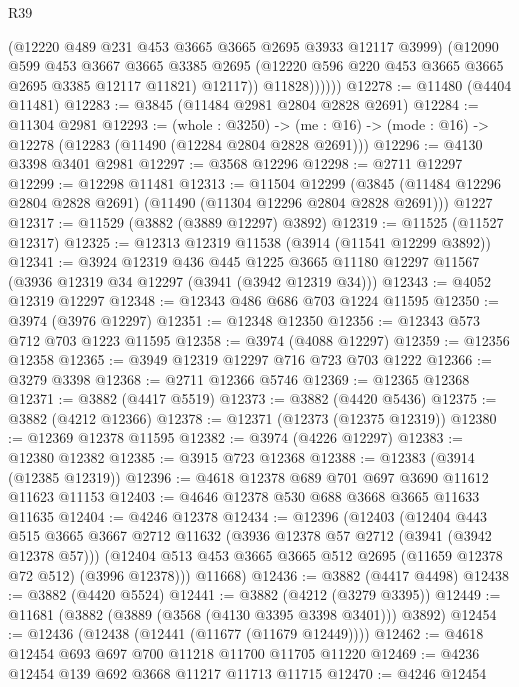 \begin{lexlean}{R39}
\begin{coremodule}
                  (@12220 @489 @231 @453 @3665 @3665 @2695 @3933 @12117 @3999)
                  (@12090
                    @599
                    @453
                    @3667
                    @3665
                    @3385
                    @2695
                    (@12220 @596 @220 @453 @3665 @3665 @2695 @3385 @12117 @11821)
                    @12117))
                @11828))))))
@12278 := @11480 (@4404 @11481)
@12283 := @3845 (@11484 @2981 @2804 @2828 @2691)
@12284 := @11304 @2981
@12293 := (whole : @3250) ->
  (me : @16) -> (mode : @16) -> @12278 (@12283 (@11490 (@12284 @2804 @2828 @2691)))
@12296 := @4130 @3398 @3401 @2981
@12297 := @3568 @12296
@12298 := @2711 @12297
@12299 := @12298 @11481
@12313 := @11504
    @12299
    (@3845 (@11484 @12296 @2804 @2828 @2691) (@11490 (@11304 @12296 @2804 @2828 @2691)))
    @1227
@12317 := @11529 (@3882 (@3889 @12297) @3892)
@12319 := @11525 (@11527 @12317)
@12325 := @12313 @12319 @11538 (@3914 (@11541 @12299 @3892))
@12341 := @3924
    @12319
    @436
    @445
    @1225
    @3665
    @11180
    @12297
    @11567
    (@3936 @12319 @34 @12297 (@3941 (@3942 @12319 @34)))
@12343 := @4052 @12319 @12297
@12348 := @12343 @486 @686 @703 @1224 @11595
@12350 := @3974 (@3976 @12297)
@12351 := @12348 @12350
@12356 := @12343 @573 @712 @703 @1223 @11595
@12358 := @3974 (@4088 @12297)
@12359 := @12356 @12358
@12365 := @3949 @12319 @12297 @716 @723 @703 @1222
@12366 := @3279 @3398
@12368 := @2711 @12366 @5746
@12369 := @12365 @12368
@12371 := @3882 (@4417 @5519)
@12373 := @3882 (@4420 @5436)
@12375 := @3882 (@4212 @12366)
@12378 := @12371 (@12373 (@12375 @12319))
@12380 := @12369 @12378 @11595
@12382 := @3974 (@4226 @12297)
@12383 := @12380 @12382
@12385 := @3915 @723 @12368
@12388 := @12383 (@3914 (@12385 @12319))
@12396 := @4618 @12378 @689 @701 @697 @3690 @11612 @11623 @11153
@12403 := @4646 @12378 @530 @688 @3668 @3665 @11633 @11635
@12404 := @4246 @12378
@12434 := @12396
    (@12403
      (@12404
        @443
        @515
        @3665
        @3667
        @2712
        @11632
        (@3936 @12378 @57 @2712 (@3941 (@3942 @12378 @57)))
        (@12404 @513 @453 @3665 @3665 @512 @2695 (@11659 @12378 @72 @512) (@3996 @12378)))
      @11668)
@12436 := @3882 (@4417 @4498)
@12438 := @3882 (@4420 @5524)
@12441 := @3882 (@4212 (@3279 @3395))
@12449 := @11681 (@3882 (@3889 (@3568 (@4130 @3395 @3398 @3401))) @3892)
@12454 := @12436 (@12438 (@12441 (@11677 (@11679 @12449))))
@12462 := @4618 @12454 @693 @697 @700 @11218 @11700 @11705 @11220
@12469 := @4236 @12454 @139 @692 @3668 @11217 @11713 @11715
@12470 := @4246 @12454

\end{coremodule}
\end{lexlean}
